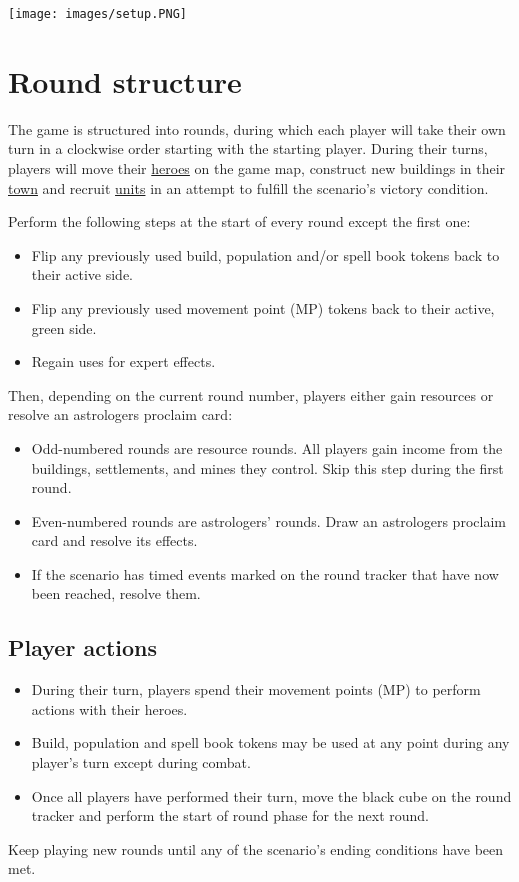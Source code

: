 \documentclass[12pt]{article}
\begin{document}
\clearpage

\begin{center}
\texttt{[image: images/setup.PNG]}
\end{center}

\clearpage

\section{Round structure}
The game is structured into rounds, during which each player will take their own turn in a clockwise order starting with the starting player. During their turns, players will move their \hyperlink{Heroes}{heroes} on the game map, construct new buildings in their \hyperlink{Town}{town} and recruit \hyperlink{Units}{units} in an attempt to fulfill the scenario’s victory condition.\par
Perform the following steps at the start of every round except the first one:
\begin{itemize}
\item Flip any previously used build, population and/or spell book tokens back to their active side.
\item Flip any previously used movement point (MP) tokens back to their active, green side.
\item Regain uses for expert effects.
\end{itemize}
Then, depending on the current round number, players either gain resources or resolve an astrologers proclaim card:
\begin{itemize}
\item Odd-numbered rounds are resource rounds. All players gain income from the buildings, settlements, and mines they control. Skip this step during the first round.
\item Even-numbered rounds are astrologers’ rounds. Draw an astrologers proclaim card and resolve its effects.
\item If the scenario has timed events marked on the round tracker that have now been reached, resolve them.
\end{itemize}
\subsection*{Player actions}
\begin{itemize}
\item During their turn, players spend their movement points (MP) to perform actions with their heroes.
\item Build, population and spell book tokens may be used at any point during any player’s turn except during combat.
\item Once all players have performed their turn, move the black cube on the round tracker and perform the start of round phase for the next round.
\end{itemize}
Keep playing new rounds until any of the scenario’s ending conditions have been met.
\end{document}
